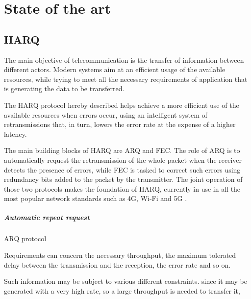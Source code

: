
\chapter{State of the art}
\label{chp:state_of_the_art}

\section{HARQ}
\label{sec:state_of_the_art_harq}
The main objective of telecommunication is the transfer of information between different actors. Modern systems aim at an efficient usage of the available resources, while trying to meet all the necessary requirements of application that is generating the data to be transferred. 

The \ac{HARQ} protocol hereby described helps achieve a more efficient use of the available resources when errors occur, using an intelligent system of retransmissions that, in turn, lowers the error rate at the expense of a higher latency.

The main building blocks of \ac{HARQ} are \ac{ARQ} and \ac{FEC}. The role of \ac{ARQ} is to automatically request the retransmission of the whole packet when the receiver detects the presence of errors, while \ac{FEC} is tasked to correct such errors using redundancy bits added to the packet by the transmitter. The joint operation of those two protocols makes the foundation of \ac{HARQ}, currently in use in all the most popular network standards such as 4G, Wi-Fi and 5G \cite{3gpp-38-series}.

\paragraph{Automatic repeat request} \ac{ARQ} protocol 

Requirements can concern the necessary throughput, the maximum tolerated delay between the transmission and the reception, the error rate and so on.


Such information may be subject to various different constraints. since it may be generated with a very high rate, so a large throughput is needed to transfer it, 

